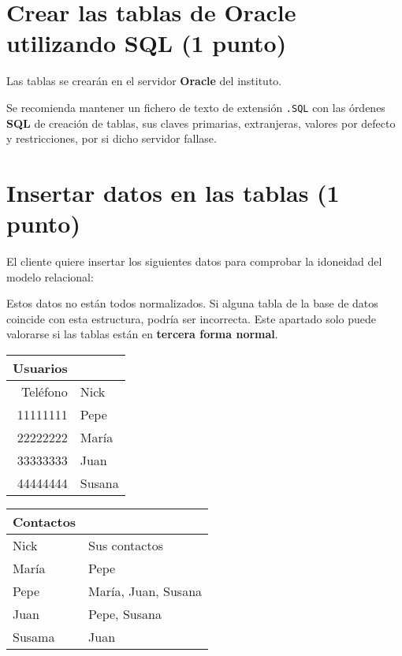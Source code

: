 \documentclass[a4paper]{article}
\begin{document}
\section{Crear las tablas de Oracle utilizando \textbf{SQL} (1 punto)}
\label{sec:org0000009}
Las tablas se crearán en el servidor \textbf{Oracle} del instituto.

Se recomienda mantener un fichero de texto de extensión \texttt{.SQL} con las órdenes \textbf{SQL} de creación de tablas, sus claves primarias, extranjeras, valores por defecto y restricciones, por si dicho servidor fallase.


\section{Insertar datos en las tablas (1 punto)}
\label{sec:org000000c}

El cliente quiere insertar los siguientes datos para comprobar la idoneidad del modelo relacional:

\begin{Aviso}
Estos datos no están todos normalizados. Si alguna tabla de la base de datos coincide con esta estructura, podría ser incorrecta.
Este apartado solo puede valorarse si las tablas están en \textbf{tercera forma normal}.
\end{Aviso}

\begin{center}
\begin{tabular}{|r|l|}
\hline
\textbf{Usuarios} & \\[0pt]
\hline
Teléfono & Nick\\[0pt]
\hline
11111111 & Pepe\\[0pt]
22222222 & María\\[0pt]
33333333 & Juan\\[0pt]
44444444 & Susana\\[0pt]
\hline
\end{tabular}
\begin{tabular}{|l|l|}
\hline
\textbf{Contactos} & \\[0pt]
\hline
Nick & Sus contactos\\[0pt]
\hline
María & Pepe\\[0pt]
Pepe & María, Juan, Susana\\[0pt]
Juan & Pepe, Susana\\[0pt]
Susama & Juan\\[0pt]
\hline
\end{tabular}
\end{center}
\end{document}
